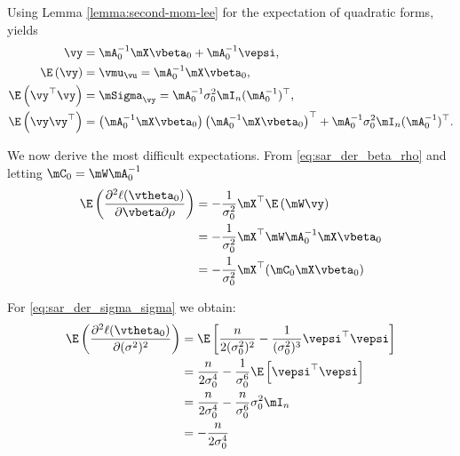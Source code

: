 \documentclass[english,12pt]{book}\usepackage[]{graphicx}\usepackage[]{xcolor}
\begin{document}
\begin{subappendices}
Using Lemma \ref{lemma:second-mom-lee} for the expectation of quadratic forms, yields
\begin{equation}
\begin{aligned}
	\vy & =  \mA_0^{-1}\mX\vbeta_0 + \mA_0^{-1}\vepsi, \\
	\E\left(\vy\right)   & = \vmu_{\vu} = \mA_0^{-1}\mX\vbeta_0, \\
	\E\left(\vy^\top\vy\right) & = \mSigma_{\vy} = \mA_0^{-1}\sigma^2_0\mI_n(\mA_0^{-1})^\top, \\
	\E\left(\vy\vy^\top\right) & = \left(\mA_0^{-1}\mX\vbeta_0\right) \left(\mA_0^{-1}\mX\vbeta_0\right)^\top + \mA_0^{-1}\sigma^2_0\mI_n(\mA_0^{-1})^\top.
\end{aligned}
\end{equation}

We now derive the most difficult expectations. From \eqref{eq:sar_der_beta_rho} and letting $\mC_0 = \mW\mA^{-1}_0$
\begin{equation}\label{eq:E_der_beta_rho}
\begin{aligned}
\E\left(\frac{\partial^2  \ell(\vtheta_0)}{\partial \vbeta \partial \rho}\right) & = - \frac{1}{\sigma^2_0} \mX^\top\E\left(\mW\vy\right) \\
& = - \frac{1}{\sigma^2_0} \mX^\top\mW\mA^{-1}_0\mX\vbeta_0 \\
& = - \frac{1}{\sigma^2_0} \mX^\top(\mC_0\mX\vbeta_0)
\end{aligned}	
\end{equation}

For \eqref{eq:sar_der_sigma_sigma} we obtain:
\begin{equation}\label{eq:E_der_sigma_sigma}
  \begin{aligned}
\E\left(\frac{\partial^2 \ell(\vtheta_0)}{\partial (\sigma^2)^2}\right) & = \E\left[\frac{n}{2(\sigma^2_0) ^2} - \frac{1}{(\sigma^2_0)^3} \vepsi^\top \vepsi\right] \\
& = \frac{n}{2\sigma^4_0} - \frac{1}{\sigma^6_0}\E\left[\vepsi^\top \vepsi\right] \\
& = \frac{n}{2\sigma^4_0} - \frac{n}{\sigma^6_0} \sigma^2_0 \mI_n \\
& = - \frac{n}{2\sigma^4_0} 
  \end{aligned}
\end{equation}


\end{subappendices}
\end{document}
